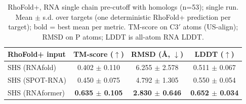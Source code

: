 \begin{table}[htbp]
\centering
\caption{RhoFold+, RNA single chain pre-cutoff with homologs (n=53); single run. Mean $\pm$ s.d. over targets (one deterministic RhoFold+ prediction per target); bold = best mean per metric. TM-score on C3$'$ atoms (US-align); RMSD on P atoms; LDDT is all-atom RNA LDDT.}
\label{tab:rf_rna_single_chain_pre_cutoff_with_homologs}
\begin{tabular}{lccc}
\toprule
RhoFold+ input & TM-score ($\uparrow$) & RMSD (\AA, $\downarrow$) & LDDT ($\uparrow$) \\
\midrule
SHS (RNAfold) & 0.402 $\pm$ 0.110 & 6.255 $\pm$ 2.578 & 0.511 $\pm$ 0.067 \\
SHS (SPOT-RNA) & 0.450 $\pm$ 0.075 & 4.792 $\pm$ 1.305 & 0.550 $\pm$ 0.054 \\
SHS (RNAformer) & \textbf{0.635 $\pm$ 0.105} & \textbf{2.830 $\pm$ 0.646} & \textbf{0.652 $\pm$ 0.034} \\
\bottomrule
\end{tabular}
\end{table}

